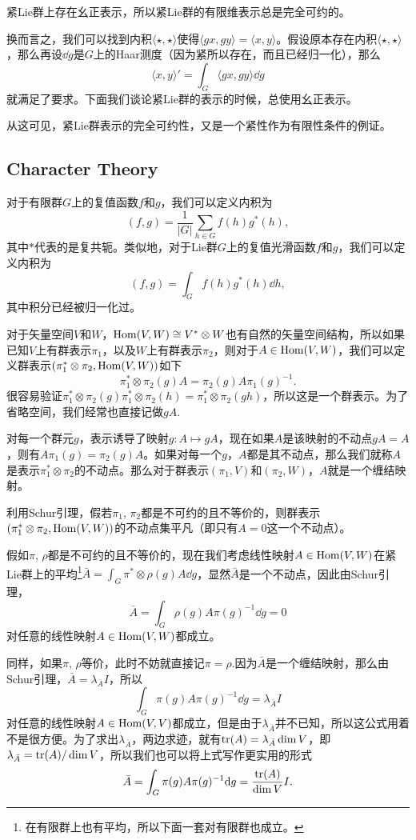 \documentclass[9pt]{extarticle}
\begin{document}
\para 紧Lie群上存在幺正表示，所以紧Lie群的有限维表示总是完全可约的。 

换而言之，我们可以找到内积$\langle \star,\star\rangle$使得$\langle gx,gy\rangle=\langle x,y\rangle$。假设原本存在内积$\langle \star,\star \rangle$，那么再设$\dd g$是$G$上的Haar测度（因为紧所以存在，而且已经归一化），那么
\[
	\langle x,y\rangle'=\int_G \langle gx,gy \rangle \dd g
\]
就满足了要求。下面我们谈论紧Lie群的表示的时候，总使用幺正表示。

从这可见，紧Lie群表示的完全可约性，又是一个紧性作为有限性条件的例证。

\subsection*{Character Theory}

\para 对于有限群$G$上的复值函数$f$和$g$，我们可以定义内积为
\[
	(f,g)=\frac{1}{|G|}\sum_{h\in G} f(h)g^*(h),
\]
其中$*$代表的是复共轭。类似地，对于Lie群$G$上的复值光滑函数$f$和$g$，我们可以定义内积为
\[
	(f,g)=\int_G f(h)g^*(h)\dd h,
\]
其中积分已经被归一化过。

\para 对于矢量空间$V$和$W$，$\operatorname{Hom}(V,W)\cong V^*\otimes W$也有自然的矢量空间结构，所以如果已知$V$上有群表示$\pi_1$，以及$W$上有群表示$\pi_2$，则对于$A\in \operatorname{Hom}(V,W)$，我们可以定义群表示$(\pi_1^*\otimes\pi_2,\operatorname{Hom}(V,W))$如下
\[
	\pi_1^*\otimes\pi_2(g)A=\pi_2(g)A\pi_1(g)^{-1}.
\]
很容易验证$\pi_1^*\otimes\pi_2(g)\pi_1^*\otimes\pi_2(h)=\pi_1^*\otimes\pi_2(gh)$，所以这是一个群表示。为了省略空间，我们经常也直接记做$gA$.

对每一个群元$g$，表示诱导了映射$g:A\mapsto gA$，现在如果$A$是该映射的不动点$gA=A$，则有$A\pi_1(g)=\pi_2(g)A$。如果对每一个$g$，$A$都是其不动点，那么我们就称$A$是表示$\pi_1^*\otimes\pi_2$的不动点。那么对于群表示$(\pi_1,V)$和$(\pi_2,W)$，$A$就是一个缠结映射。

\para 利用Schur引理，假若$\pi_1$, $\pi_2$都是不可约的且不等价的，则群表示$(\pi_1^*\otimes\pi_2,\operatorname{Hom}(V,W))$的不动点集平凡（即只有$A=0$这一个不动点）。

假如$\pi$, $\rho$都是不可约的且不等价的，现在我们考虑线性映射$A\in \operatorname{Hom}(V,W)$在紧Lie群上的平均\footnote{在有限群上也有平均，所以下面一套对有限群也成立。}$\bar{A}=\int_G \pi^*\otimes\rho(g)A \dd g$，显然$\bar{A}$是一个不动点，因此由Schur引理，
\[
	\bar{A}=\int_G \rho(g)A\pi(g)^{-1}\dd g=0
\]
对任意的线性映射$A\in \operatorname{Hom}(V,W)$都成立。

同样，如果$\pi$, $\rho$等价，此时不妨就直接记$\pi=\rho$.因为$\bar{A}$是一个缠结映射，那么由Schur引理，$\bar{A}=\lambda_{\bar{A}} I$，所以
\[
	\int_G \pi(g)A\pi(g)^{-1}\dd g=\lambda_{\bar{A}} I
\]
对任意的线性映射$A\in \operatorname{Hom}(V,V)$都成立，但是由于$\lambda_{\bar{A}}$并不已知，所以这公式用着不是很方便。为了求出$\lambda_{\bar{A}}$，两边求迹，就有$\operatorname{tr}(A)=\lambda_{\bar{A}} \dim V$，即$\lambda_{\bar{A}}=\operatorname{tr}(A)/\dim V$，所以我们也可以将上式写作更实用的形式
\[
	\bar{A}=\int_G \pi(g)A\pi(g)^{-1}\mathrm{d} g=\frac{\operatorname{tr}(A)}{\dim V}I.
\]
\end{document}
